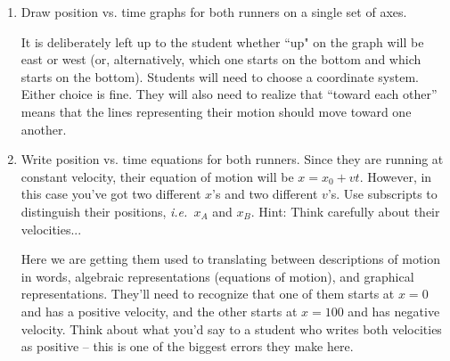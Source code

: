 \documentclass[12pt]{article}
\newcommand{\ie}{{\em i.e.\ }}
\begin{document}
\begin{enumerate}

\item Draw position vs. time graphs for both runners on a single set of axes.

\begin{center}





\end{center}

{\color{Red} It is deliberately left up to the student whether ``up" on the graph will be east or west (or, alternatively,
	which one starts on the bottom and which starts on the bottom). Students will need to choose a coordinate system. Either choice is fine. They will also need to realize that ``toward each other'' means that the lines representing their motion should move toward one another.}


\item Write position vs. time equations for both runners. Since they are running at constant velocity, their equation of motion will be $x=x_0 + vt$. However, in this case you've got two different $x$'s and two different $v$'s. Use subscripts to distinguish their positions, \ie $x_A$ and $x_B$. Hint: Think carefully about their velocities...

{\color{Red} Here we are getting them used to translating between descriptions of motion in words, algebraic representations (equations of motion), and graphical representations. They'll need to recognize that one of them starts at $x=0$ and has a positive velocity, and the other starts at $x=100$ and has negative velocity. Think about what you'd say to a student who writes both velocities as positive -- this is one of the biggest errors they make here.}

\vspace{1.5in}


\end{enumerate}
\end{document}

